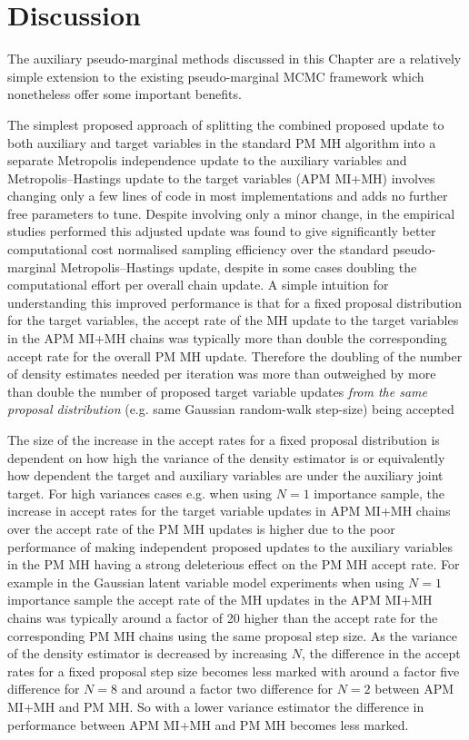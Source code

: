 \section{Discussion}

The auxiliary pseudo-marginal methods discussed in this Chapter are a relatively simple extension to the existing pseudo-marginal \ac{MCMC} framework which nonetheless offer some important benefits. 

The simplest proposed approach of splitting the combined proposed update to both auxiliary and target variables in the standard \ac{PM} \ac{MH} algorithm into a separate Metropolis independence update to the auxiliary variables and Metropolis--Hastings update to the target variables (\ac{APM} \ac{MI}+\ac{MH}) involves changing only a few lines of code in most implementations and adds no further free parameters to tune. Despite involving only a minor change, in the empirical studies performed this adjusted update was found to give significantly better computational cost normalised sampling efficiency over the standard pseudo-marginal Metropolis--Hastings update, despite in some cases doubling the computational effort per overall chain update. A simple intuition for understanding this improved performance is that for a fixed proposal distribution for the target variables, the accept rate of the \ac{MH} update to the target variables in the \ac{APM} \ac{MI}+\ac{MH} chains was typically more than double the corresponding accept rate for the overall \ac{PM} \ac{MH} update. Therefore the doubling of the number of density estimates needed per iteration was more than outweighed by more than double the number of proposed target variable updates \emph{from the same proposal distribution} (e.g. same Gaussian random-walk step-size) being accepted

The size of the increase in the accept rates for a fixed proposal distribution is dependent on how high the variance of the density estimator is or equivalently how dependent the target and auxiliary variables are under the auxiliary joint target. For high variances cases e.g. when using $N=1$ importance sample, the increase in accept rates for the target variable updates in \ac{APM} \ac{MI}+\ac{MH} chains over the accept rate of the \ac{PM} \ac{MH} updates is higher due to the poor performance of making independent proposed updates to the auxiliary variables in the \ac{PM} \ac{MH} having a strong deleterious effect on the \ac{PM} \ac{MH} accept rate. For example in the Gaussian latent variable model experiments when using $N=1$ importance sample the accept rate of the \ac{MH} updates in the \ac{APM} \ac{MI}+\ac{MH} chains was typically around a factor of 20 higher than the accept rate for the corresponding \ac{PM} \ac{MH} chains using the same proposal step size. As the variance of the density estimator is decreased by increasing $N$, the difference in the accept rates for a fixed proposal step size becomes less marked with around a factor five difference for $N=8$ and around a factor two difference for $N=2$ between \ac{APM} \ac{MI}+\ac{MH} and \ac{PM} \ac{MH}. So with a lower variance estimator the difference in performance between \ac{APM} \ac{MI}+\ac{MH} and \ac{PM} \ac{MH} becomes less marked. 

